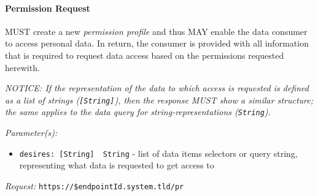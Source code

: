\documentclass[12pt,english,a4paper,titlepage,cleardoublepage=empty,dottedtoc]{report}
\newenvironment{Shaded}{\begin{snugshade}}{\end{snugshade}}
\newcommand{\DataTypeTok}[1]{\textcolor[rgb]{0.13,0.29,0.53}{#1}}
\newcommand{\DecValTok}[1]{\textcolor[rgb]{0.00,0.00,0.81}{#1}}
\newcommand{\StringTok}[1]{\textcolor[rgb]{0.31,0.60,0.02}{#1}}
\newcommand{\OtherTok}[1]{\textcolor[rgb]{0.56,0.35,0.01}{#1}}
\newcommand{\FunctionTok}[1]{\textcolor[rgb]{0.00,0.00,0.00}{#1}}
\newcommand{\ErrorTok}[1]{\textcolor[rgb]{0.64,0.00,0.00}{\textbf{#1}}}
\providecommand{\tightlist}{%
  \setlength{\itemsep}{0pt}\setlength{\parskip}{0pt}}
\begin{document}
\begin{Shaded}
\end{Shaded}

\hypertarget{spec_api_permission-request}{\paragraph{Permission
Request}\label{spec_api_permission-request}}

MUST create a new \emph{permission profile} and thus MAY enable the data
consumer to access personal data. In return, the consumer is provided
with all information that is required to request data access based on
the permissions requested herewith.

\emph{NOTICE: If the representation of the data to which access is
requested is defined as a list of strings (\texttt{{[}String{]}}), then
the response MUST show a similar structure; the same applies to the data
query for string-representations (\texttt{String}).}

\emph{Parameter(s):}

\begin{itemize}
\tightlist
\item
  \texttt{desires:\ {[}String{]}\ \textbar{}\textbar{}\ String} - list
  of data items selectors or query string, representing what data is
  requested to get access to
\end{itemize}

\emph{Request:} \texttt{https://\$endpointId.system.tld/pr}
\end{document}

